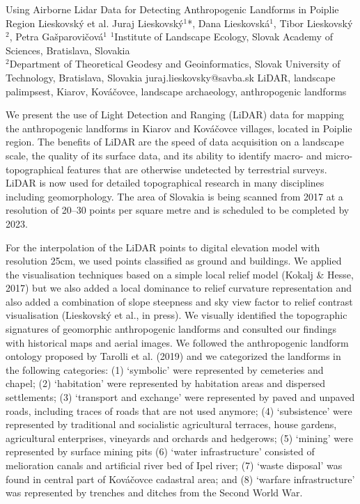 \abstract
{Using Airborne Lidar Data for Detecting Anthropogenic Landforms in Poiplie Region} %
{Lieskovský et al.} %
{Juraj Lieskovský$^1$*, Dana Lieskovská$^1$, Tibor Lieskovský$^2$, Petra Gašparovičová$^1$} %
{\KLtag} %
{$^1$Institute of Landscape Ecology, Slovak Academy of Sciences, Bratislava, Slovakia\\
$^2$Department of Theoretical Geodesy and Geoinformatics, Slovak University of Technology, Bratislava, Slovakia
} %
{juraj.lieskovsky@savba.sk}  %
{LiDAR, landscape palimpsest, Kiarov, Kováčovce, landscape archaeology, anthropogenic landforms}%
{We present the use of Light Detection and Ranging  (LiDAR) data for mapping the anthropogenic landforms in Kiarov and Kováčovce villages, located in Poiplie region. The benefits of LiDAR are the speed of data acquisition on a landscape scale, the quality of its surface data, and its ability to identify macro- and micro-topographical features that are otherwise undetected by terrestrial surveys. LiDAR is now used for detailed topographical research in many disciplines including geomorphology. The area of Slovakia is being scanned from 2017 at a resolution of 20–30 points per square metre and is scheduled to be completed by 2023. 
	
For the interpolation of the LiDAR points to digital elevation model with resolution 25cm, we used points classified as ground and buildings. We applied the visualisation techniques based on a simple local relief model (Kokalj \& Hesse, 2017) but we also added a local dominance to relief curvature representation and also added a combination of slope steepness and sky view factor to relief contrast visualisation (Lieskovský et al., in press). We visually identified the topographic signatures of geomorphic anthropogenic landforms and consulted our findings with historical maps and aerial images. We followed the anthropogenic landform ontology proposed by Tarolli et al. (2019) and we categorized the landforms in the following categories: (1) ‘symbolic’ were represented by cemeteries and chapel; (2) ‘habitation’ were represented by habitation areas and dispersed settlements; (3) ‘transport and exchange’ were represented by paved and unpaved roads, including traces of roads that are not used anymore; (4) ‘subsistence’ were represented by traditional and socialistic agricultural terraces, house gardens, agricultural enterprises, vineyards and orchards and  hedgerows; (5) ‘mining’ were represented by surface mining pits (6) ‘water infrastructure’ consisted of melioration canals and artificial river bed of Ipel river; (7) ‘waste disposal’ was found in central part of Kováčovce cadastral area; and (8) ‘warfare infrastructure’ was represented by trenches and ditches from the Second World War.
}%
